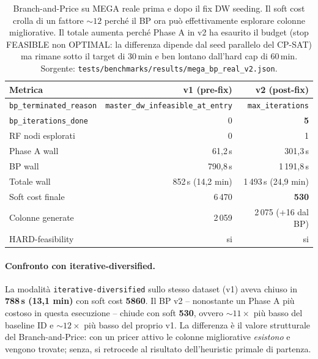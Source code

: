 \begin{table}[h]
\centering
\sffamily\small
\begin{tabular}{lrr}
\toprule
Metrica & v1 (pre-fix) & v2 (post-fix) \\
\midrule
\texttt{bp\_terminated\_reason} & \texttt{master\_dw\_infeasible\_at\_entry} & \texttt{max\_iterations} \\
\texttt{bp\_iterations\_done}   & 0    & \textbf{5} \\
RF nodi esplorati                & 0    & 1 \\
Phase A wall                     & 61{,}2\,s & 301{,}3\,s \\
BP wall                          & 790{,}8\,s & 1\,191{,}8\,s \\
Totale wall                      & 852\,s (14{,}2 min) & 1\,493\,s (24{,}9 min) \\
Soft cost finale                 & 6\,470 & \textbf{530} \\
Colonne generate                 & 2\,059 & 2\,075 (+16 dal BP) \\
HARD-feasibility                 & si    & si \\
\bottomrule
\end{tabular}
\caption{Branch-and-Price su MEGA reale prima e dopo il fix DW
seeding. Il soft cost crolla di un fattore $\sim 12$ perch\'e
il BP ora pu\`o effettivamente esplorare colonne migliorative.
Il totale aumenta perch\'e Phase A in v2 ha esaurito il budget
(stop FEASIBLE non OPTIMAL: la differenza dipende dal seed
parallelo del CP-SAT) ma rimane sotto il target di 30\,min e
ben lontano dall'hard cap di 60\,min.
Sorgente: \texttt{tests/benchmarks/results/mega\_bp\_real\_v2.json}.}
\label{tab:bench-bp-mega-real}
\end{table}

\paragraph{Confronto con iterative-diversified.} La modalit\`a
\texttt{iterative-diversified} sullo stesso dataset (v1) aveva
chiuso in \textbf{788\,s (13{,}1 min)} con soft cost
\textbf{5860}. Il BP v2 -- nonostante un Phase A pi\`u costoso
in questa esecuzione -- chiude con soft \textbf{530}, ovvero
$\sim 11 \times$ pi\`u basso del baseline ID e $\sim 12 \times$
pi\`u basso del proprio v1. La differenza \`e il valore
strutturale del Branch-and-Price: con un pricer attivo le
colonne migliorative \emph{esistono} e vengono trovate; senza,
si retrocede al risultato dell'heuristic primale di partenza.

